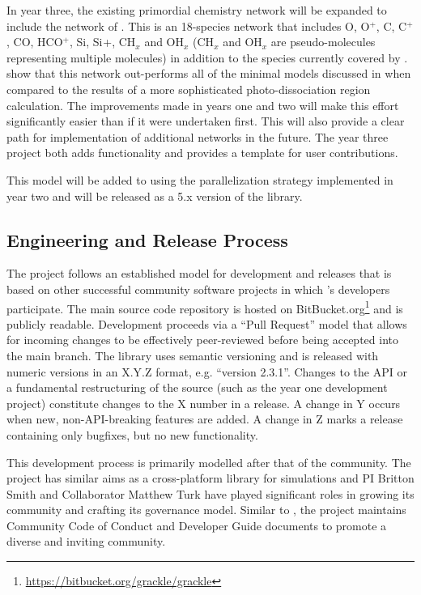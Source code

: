 In year three, the existing primordial chemistry network will be
expanded to include the network of \citet{2016arXiv161009023G}.  This
is an 18-species network that includes O, O$^{+}$, C, C$^{+}$, CO,
HCO$^{+}$, Si, Si$^{}$+, CH$_{x}$ and OH$_{x}$ (CH$_{x}$ and OH$_{x}$
are pseudo-molecules representing multiple molecules) in addition to
the species currently covered by \grackle{}.
\citet{2016arXiv161009023G} show that this network out-performs all of
the minimal models discussed in \citep{2012MNRAS.421..116G} when
compared to the results of a more sophisticated photo-dissociation
region calculation.  The improvements made in years one and two will
make this effort significantly easier than if it were undertaken
first.  This will also provide a clear path for implementation of
additional networks in the future.  The year three project both adds
functionality and provides a template for user contributions.

This model will be added to \grackle{} using the parallelization
strategy implemented in year two and will be released as a 5.x version
of the \grackle{} library.

\subsection{Engineering and Release Process}

The \grackle{} project follows an established model for development
and releases that is based on other successful community software
projects in which \grackle{}'s developers participate.  The main
source code repository is hosted on
BitBucket.org\footnote{\url{https://bitbucket.org/grackle/grackle}}
and is publicly readable.  Development proceeds via a ``Pull Request''
model that allows for incoming changes to be effectively peer-reviewed
before  being accepted into the main branch.  The \grackle{} library
uses semantic versioning and
is released with numeric versions in an X.Y.Z format, e.g. ``version
2.3.1''.  Changes to the \grackle{} API or a fundamental restructuring
of the source (such as the year one development project) constitute
changes to the X number in a release.  A change in Y occurs when new,
non-API-breaking features are added.  A change in Z marks a release
containing only bugfixes, but no new functionality.

This development process is primarily modelled after that
of the \yt{} community.  The \yt{} project has similar
aims as a cross-platform library for simulations and PI Britton Smith
and Collaborator Matthew Turk have played significant roles in growing
its community and crafting its governance model.  Similar to
\yt{}, the \grackle{} project maintains Community Code of
Conduct and Developer Guide documents to promote a diverse and
inviting community.

